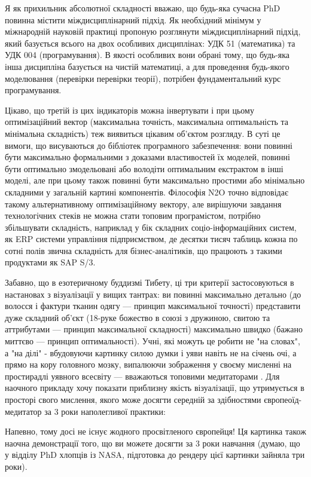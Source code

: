 Я як прихильник абсолютної складності вважаю, що будь-яка
сучасна PhD повинна містити міждисциплінарний підхід. Як
необхідний мінімум у міжнародній науковій практиці пропоную
розглянути міждисциплінарний підхід, який базується всього
на двох особливих дисциплінах: УДК 51 (математика) та
УДК 004 (програмування). В якості особливих вони обрані
тому, що будь-яка інша дисципліна базується на чистій
математиці, а для проведення будь-якого моделювання
(перевірки перевірки теорії), потрібен фундаментальний курс програмування.

Цікаво, що третій із цих індикаторів можна інвертувати
і при цьому оптимізаційний вектор (максимальна точність,
максимальна оптимальність та мінімальна складність) теж
виявиться цікавим об'єктом розгляду. В суті це вимоги,
 що висуваються до бібліотек програмного забезпечення:
вони повинні бути максимально формальними з доказами
властивостей їх моделей, повинні бути оптимально
змодельовані або володіти оптимальним екстрактом
в інші моделі, але при цьому також повинні бути
максимально простими або мінімально складними у
загальній картині компонентів. Філософія N2O точно
відповідає такому альтернативному оптимізаційному
вектору, але вирішуючи завдання технологічних стеків
не можна стати топовим програмістом, потрібно
збільшувати складність, наприклад у бік складних
соціо-інформаційних систем, як ERP системи управління
підприємством, де десятки тисяч таблиць кожна по
сотні полів звична складність для бізнес-аналітиків,
що працюють з такими продуктами як SAP S/3.

Забавно, що в езотеричному буддизмі Тибету,
ці три критерії застосовуються в настановах
з візуалізації у вищих тантрах: ви повинні
максимально детально (до волосся і фактури
тканин одягу --- принцип максимальної точності)
представити дуже складний об'єкт (18-руке божество
в союзі з дружиною, свитою та аттрибутами --- принцип
максимальної складності) максимально швидко (бажано
миттєво --- принцип оптимальності). Учні, які можуть
це робити не "на словах", а "на ділі" - вбудовуючи
картинку силою думки і уяви навіть не на січень очі,
а прямо на кору головного мозку, випалюючи зображення
у своєму мисленні на простирадлі уявного всесвіту ---
вважаються топовими медитаторами . Для наочного прикладу
хочу показати приблизну якість візуалізації, що
утримується в просторі свого мислення, якого може
досягти середній за здібностями європеоїд-медитатор
за 3 роки наполегливої практики:

Напевно, тому досі не існує жодного просвітленого
європейця! Ця картинка також наочна демонстрації
того, що ви можете досягти за 3 роки навчання (думаю,
що у відділу PhD хлопців із NASA, підготовка до рендеру
цієї картинки зайняла три роки).

\normalsize
